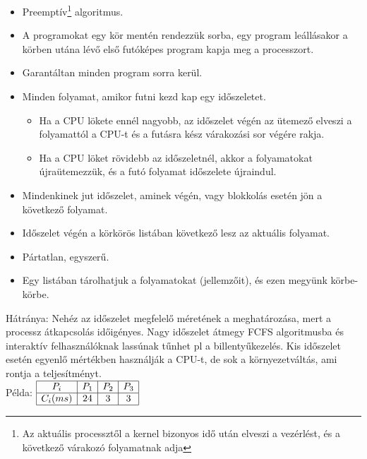 \documentclass[tikz,12pt,margin=0px]{article}
\begin{document}
    \begin{itemize}[topsep=8pt,itemsep=4pt,partopsep=4pt, parsep=4pt]
        \item Preemptív\footnote{Az aktuális processztől a kernel bizonyos idő után elveszi a vezérlést, és a következő várakozó folyamatnak adja} algoritmus.
        \item A programokat egy kör mentén rendezzük sorba, egy program leállásakor a körben utána lévő első futóképes program kapja meg a processzort.
        \item Garantáltan minden program sorra kerül.
        \item Minden folyamat, amikor futni kezd kap egy időszeletet.
        \begin{itemize}
            \item Ha a CPU lökete ennél nagyobb, az időszelet végén az ütemező elveszi a folyamattól a CPU-t és a futásra kész várakozási sor végére rakja.
            \item Ha a CPU löket rövidebb az időszeletnél, akkor a folyamatokat újraütemezzük, és a futó folyamat időszelete újraindul.
        \end{itemize}
        \item Mindenkinek jut időszelet, aminek végén, vagy blokkolás esetén jön a következő folyamat.
        \item Időszelet végén a körkörös listában következő lesz az aktuális folyamat.
        \item Pártatlan, egyszerű.
        \item Egy listában tárolhatjuk a folyamatokat (jellemzőit), és ezen megyünk körbe-körbe.
    \end{itemize}

    \noindent Hátránya: Nehéz az időszelet megfelelő méretének a meghatározása, mert a processz átkapcsolás időigényes. Nagy időszelet átmegy FCFS algoritmusba és interaktív felhasználóknak lassúnak tűnhet pl a billentyűkezelés. Kis időszelet esetén egyenlő mértékben használják a CPU-t, de sok a környezetváltás, ami rontja a teljesítményt.\\

    \noindent Példa: $\begin{array}{|c|c|c|c|}
                        \hline
                         P_{i} & P_{1} & P_{2} & P_{3} \\ \hline
                         C_{i}(ms) & 24 & 3 & 3 \\ \hline
                       \end{array}$\\
\end{document}
